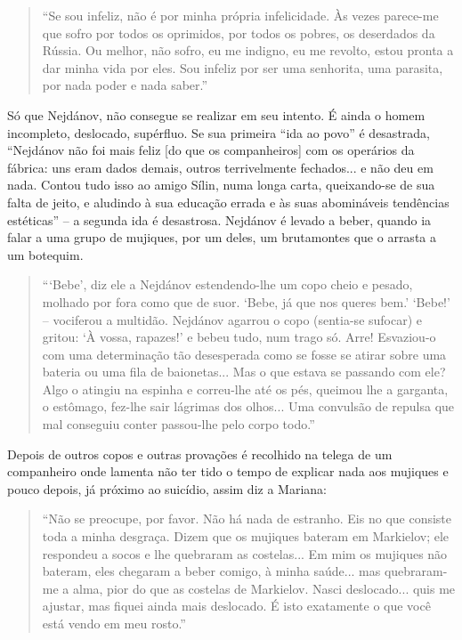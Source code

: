 \begin{quote}
``Se sou infeliz, não é por minha própria infelicidade. Às vezes
parece-me que sofro por todos os oprimidos, por todos os pobres, os
deserdados da Rússia. Ou melhor, não sofro, eu me indigno, eu me
revolto, estou pronta a dar minha vida por eles. Sou infeliz por ser uma
senhorita, uma parasita, por nada poder e nada saber.''
\end{quote}

Só que Nejdánov, não consegue se realizar em seu intento. É ainda o
homem incompleto, deslocado, supérfluo. Se sua primeira ``ida ao povo''
é desastrada, ``Nejdánov não foi mais feliz {[}do que os companheiros{]}
com os operários da fábrica: uns eram dados demais, outros terrivelmente
fechados... e não deu em nada. Contou tudo isso ao amigo Sílin, numa
longa carta, queixando-se de sua falta de jeito, e aludindo à sua
educação errada e às suas abomináveis tendências estéticas'' -- a
segunda ida é desastrosa. Nejdánov é levado a beber, quando ia falar a
uma grupo de mujiques, por um deles, um brutamontes que o arrasta a um
botequim.

\begin{quote}
```Bebe', diz ele a Nejdánov estendendo-lhe um copo cheio e pesado,
molhado por fora como que de suor. `Bebe, já que nos queres bem.'
`Bebe!' -- vociferou a multidão. Nejdánov agarrou o copo (sentia-se
sufocar) e gritou: `À vossa, rapazes!' e bebeu tudo, num trago só. Arre!
Esvaziou-o com uma determinação tão desesperada como se fosse se atirar
sobre uma bateria ou uma fila de baionetas... Mas o que estava se
passando com ele? Algo o atingiu na espinha e correu-lhe até os pés,
queimou lhe a garganta, o estômago, fez-lhe sair lágrimas dos olhos...
Uma convulsão de repulsa que mal conseguiu conter passou-lhe pelo corpo
todo.''
\end{quote}

Depois de outros copos e outras provações é recolhido na telega de um
companheiro onde lamenta não ter tido o tempo de explicar nada aos
mujiques e pouco depois, já próximo ao suicídio, assim diz a Mariana:

\begin{quote}
``Não se preocupe, por favor. Não há nada de estranho. Eis no que
consiste toda a minha desgraça. Dizem que os mujiques bateram em
Markielov; ele respondeu a socos e lhe quebraram as costelas... Em mim
os mujiques não bateram, eles chegaram a beber comigo, à minha saúde...
mas quebraram-me a alma, pior do que as costelas de Markielov. Nasci
deslocado... quis me ajustar, mas fiquei ainda mais deslocado. É isto
exatamente o que você está vendo em meu rosto.''
\end{quote}

